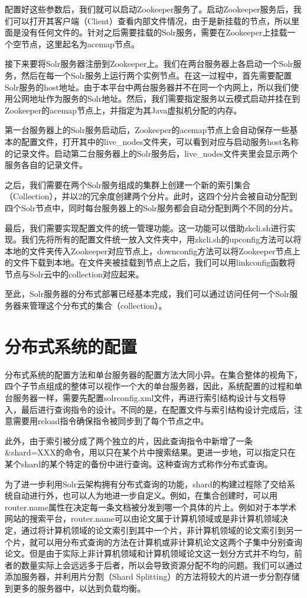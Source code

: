 配置好这些参数后，我们就可以启动Zookeeper服务了。启动Zookeeper服务后，我们可以打开其客户端（Client）查看内部文件情况，由于是新挂载的节点，所以里面是没有任何文件的。针对之后需要挂载的Solr服务，需要在Zookeeper上挂载一个空节点，这里起名为acemap节点。

接下来要将Solr服务器注册到Zookeeper上。我们在两台服务器上各启动一个Solr服务，然后在每一个Solr服务上运行两个实例节点。在这一过程中，首先需要配置Solr服务的host地址。由于本平台中两台服务器并不在同一个内网上，所以我们使用公网地址作为服务的Solr地址。然后，我们需要指定服务以云模式启动并挂在到Zookeeper的acemap节点上，并指定为其Java虚拟机分配的内存。

第一台服务器上的Solr服务启动后，Zookeeper的acemap节点上会自动保存一些基本的配置文件，打开其中的live\_nodes文件夹，可以看到对应与启动服务host名称的记录文件。启动第二台服务器上的Solr服务后，live\_nodes文件夹里会显示两个服务各自的记录文件。

之后，我们需要在两个Solr服务组成的集群上创建一个新的索引集合（Collection），并以2的冗余度创建两个分片。此时，这四个分片会被自动分配到四个Solr节点中，同时每台服务器上的Solr服务都会自动分配到两个不同的分片。

最后，我们需要实现配置文件的统一管理功能。这一功能可以借助zkcli.sh进行实现。我们先将所有的配置文件统一放入文件夹中，用zkcli.sh的upconfig方法可以将本地的文件夹传入Zookeeper对应节点上，downconfig方法可以将Zookeeper节点上的文件下载到本地。在文件夹被挂载到节点上之后，我们可以用linkconfig函数将节点与Solr云中的collection对应起来。

至此，Solr服务器的分布式部署已经基本完成，我们可以通过访问任何一个Solr服务器来管理这个分布式的集合（collection）。

\section{分布式系统的配置}
分布式系统的配置方法和单台服务器的配置方法大同小异。在集合整体的视角下，四个子节点组成的整体可以视作一个大的单台服务器，因此，系统配置的过程和单台服务器一样，需要先配置solrconfig.xml文件，再进行索引结构设计与文档导入，最后进行查询指令的设计。不同的是，在配置文件与索引结构设计完成后，注意需要用reload指令确保指令被同步到了每个节点之中。

此外，由于索引被分成了两个独立的片，因此查询指令中新增了一条\&shard=XXX的命令，用以只在某个片中搜索结果。更进一步地，可以指定只在某个shard的某个特定的备份中进行查询。这种查询方式称作分布式查询。

为了进一步利用Solr云架构拥有分布式查询的功能，shard的构建过程除了交给系统自动进行外，也可以人为地进一步自定义。例如，在集合创建时，可以用router.name属性在决定每一条文档被分发到哪一个具体的片上。例如对于本学术网站的搜索平台，router.name可以由论文属于计算机领域或是非计算机领域决定，通过将计算机领域的论文索引到其中一个片，非计算机领域的论文索引到另一个片，就可以用分布式查询的方法在计算机或非计算机论文这两个子集中分别查询论文。但是由于实际上非计算机领域和计算机领域论文这一划分方式并不均匀，前者的数量实际上会远远多于后者，所以会导致资源分配不均的问题。我们可以通过添加服务器，并利用片分割（Shard Splitting）的方法将较大的片进一步分割存储到更多的服务器中，以达到负载均衡。

